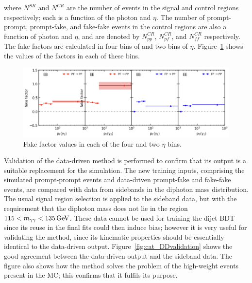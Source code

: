 where $N^{SR}$ and $N^{CR}$ are the number of events in the signal and control regions respectively;
each is a function of the photon \pt and $\eta$.
The number of prompt-prompt, prompt-fake, and fake-fake events in the control regions 
are also a function of photon \pt and $\eta$, 
and are denoted by $N^{CR}_{pp}$, $N^{CR}_{pf}$, and $N^{CR}_{ff}$ respectively.
The fake factors are calculated in four bins of \pt and two bins of $\eta$.
Figure~\ref{fig:cat_FakeFactors} shows the values of the factors in each of these bins.

\begin{figure}
  \centering
  \includegraphics[width=\textwidth]{Figures/Categorisation/fakeFactors.png}
  \caption[Values of the fake factors used in the data-driven dijet BDT method.]
  {
    Fake factor values in each of the four \pt and two $\eta$ bins.
  }
  \label{fig:cat_FakeFactors}
\end{figure}


Validation of the data-driven method is performed to confirm that its output is 
a suitable replacement for the simulation.
The new training inputs, 
comprising the simulated prompt-prompt events and data-driven prompt-fake and fake-fake events, 
are compared with data from sidebands in the diphoton mass distribution.
The usual signal region selection is applied to the sideband data, 
but with the requirement that the diphoton mass does not lie in the region $115 < m_{\gamma\gamma} < \SI{135}{GeV}$.
These data cannot be used for training the dijet BDT since its reuse in the final fits 
could then induce bias; 
however it is very useful for validating the method, 
since its kinematic properties should be essentially identical to the data-driven output.
Figure~\ref{fig:cat_DDvalidation} shows the good agreement between the data-driven output
and the sideband data. 
The figure also shows how the method solves the problem of the high-weight events present in the MC; 
this confirms that it fulfils its purpose.

